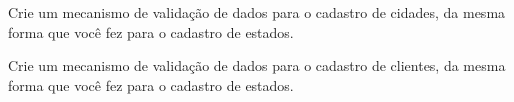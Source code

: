 \begin{projetoSemArquivo}{}{}{}
    Crie um mecanismo de validação de dados para o cadastro de cidades, da mesma forma que você fez para o cadastro de estados.
\end{projetoSemArquivo}

\begin{projetoSemArquivo}{}{}{}
    Crie um mecanismo de validação de dados para o cadastro de clientes, da mesma forma que você fez para o cadastro de estados.
\end{projetoSemArquivo}